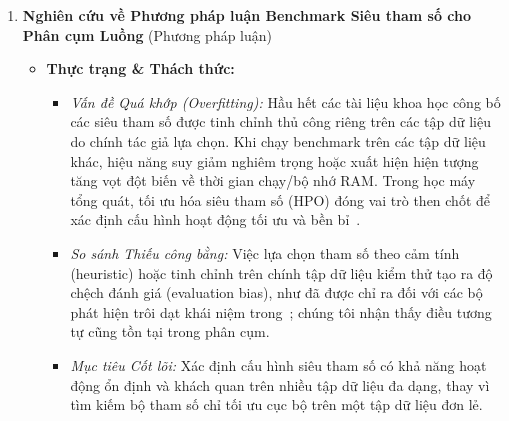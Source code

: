 \begin{enumerate}[label=\textbf{C\arabic*.},leftmargin=2.2em]
  \item \textbf{Nghiên cứu về Phương pháp luận Benchmark Siêu tham số cho Phân cụm Luồng} \hfill{\small(Phương pháp luận)}\\
  \begin{itemize}[leftmargin=1.2em,itemsep=2pt,topsep=1pt]
    \item \textbf{Thực trạng \& Thách thức:}
    \begin{itemize}[leftmargin=1.2em,itemsep=1pt]
      \item \emph{Vấn đề Quá khớp (Overfitting):} Hầu hết các tài liệu khoa học công bố các siêu tham số được tinh chỉnh thủ công riêng trên các tập dữ liệu do chính tác giả lựa chọn. Khi chạy benchmark trên các tập dữ liệu khác, hiệu năng suy giảm nghiêm trọng hoặc xuất hiện hiện tượng tăng vọt đột biến về thời gian chạy/bộ nhớ RAM. Trong học máy tổng quát, tối ưu hóa siêu tham số (HPO) đóng vai trò then chốt để xác định cấu hình hoạt động tối ưu và bền bỉ~\cite{franceschi2024hyperparameter}.
      \item \emph{So sánh Thiếu công bằng:} Việc lựa chọn tham số theo cảm tính (heuristic) hoặc tinh chỉnh trên chính tập dữ liệu kiểm thử tạo ra độ chệch đánh giá (evaluation bias), như đã được chỉ ra đối với các bộ phát hiện trôi dạt khái niệm trong~\cite{cerqueira2026framework}; chúng tôi nhận thấy điều tương tự cũng tồn tại trong phân cụm.
      \item \emph{Mục tiêu Cốt lõi:} Xác định cấu hình siêu tham số có khả năng hoạt động ổn định và khách quan trên nhiều tập dữ liệu đa dạng, thay vì tìm kiếm bộ tham số chỉ tối ưu cục bộ trên một tập dữ liệu đơn lẻ.
    \end{itemize}


\end{itemize}
\end{enumerate}
